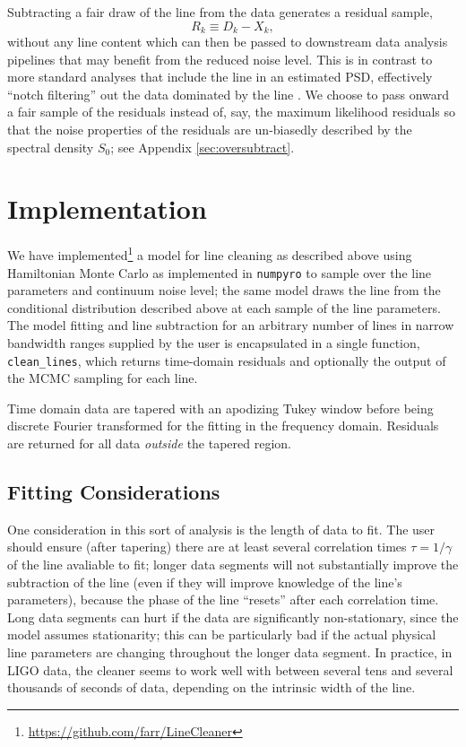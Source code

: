 \documentclass[modern]{aastex631}
\begin{document}
Subtracting a fair draw of the line from the data generates a residual sample, 
\begin{equation}
    R_k \equiv D_k - X_k,
\end{equation}
without any line content which can then be passed to downstream data analysis
pipelines that may benefit from the reduced noise level.  This is in contrast to
more standard analyses that include the line in an estimated PSD, effectively
``notch filtering'' out the data dominated by the line
\citep{Veitch2015,Littenberg2015}.  We choose to pass onward a fair sample of
the residuals instead of, say, the maximum likelihood residuals so that the
noise properties of the residuals are un-biasedly described by the spectral
density $S_0$; see Appendix \ref{sec:oversubtract}.

\section{Implementation}

We have implemented\footnote{\url{https://github.com/farr/LineCleaner}} a model for
line cleaning as described above using Hamiltonian Monte Carlo \citep{Neal2011}
as implemented in \texttt{numpyro} \cite{bingham2019pyro,phan2019composable} to
sample over the line parameters and continuum noise level; the same model draws
the line from the conditional distribution described above at each sample of the
line parameters.  The model fitting and line subtraction for an arbitrary number
of lines in narrow bandwidth ranges supplied by the user is encapsulated in a
single function, \texttt{clean\_lines}, which returns time-domain residuals and
optionally the output of the MCMC sampling for each line.

Time domain data are tapered with an apodizing Tukey window before being
discrete Fourier transformed for the fitting in the frequency domain.  Residuals
are returned for all data \emph{outside} the tapered region.

\subsection{Fitting Considerations}

One consideration in this sort of analysis is the length of data to fit.  The
user should ensure (after tapering) there are at least several correlation times
$\tau = 1/\gamma$ of the line avaliable to fit; longer data segments will not
substantially improve the subtraction of the line (even if they will improve
knowledge of the line's parameters), because the phase of the line ``resets''
after each correlation time.  Long data segments can hurt if the data are
significantly non-stationary, since the model assumes stationarity; this can be
particularly bad if the actual physical line parameters are changing throughout
the longer data segment.  In practice, in LIGO data, the cleaner seems to work
well with between several tens and several thousands of seconds of data,
depending on the intrinsic width of the line.
\end{document}
